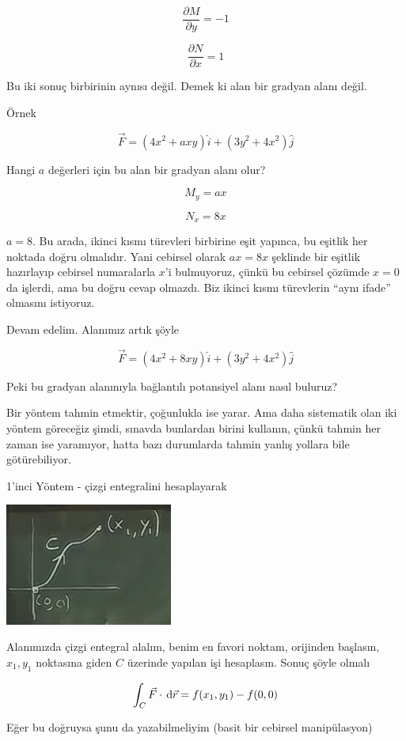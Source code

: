 \documentclass[12pt,fleqn]{article}\usepackage{../../common}
\begin{document}
$$ \frac{\partial M}{\partial y} = -1 $$

$$ \frac{\partial N}{\partial x} = 1 $$

Bu iki sonuç birbirinin aynısı değil. Demek ki alan bir gradyan alanı
değil. 

Örnek

$$ \vec{F} = (4x^2 + axy)\hat{i} + (3y^2 + 4x^2)\hat{j} $$

Hangi $a$ değerleri için bu alan bir gradyan alanı olur? 

$$ M_y = ax $$

$$ N_x = 8x $$

$a=8$. Bu arada, ikinci kısmı türevleri birbirine eşit yapınca, bu eşitlik her
noktada doğru olmalıdır. Yani cebirsel olarak $ax = 8x$ şeklinde bir eşitlik
hazırlayıp cebirsel numaralarla $x$'i bulmuyoruz, çünkü bu cebirsel çözümde
$x=0$ da işlerdi, ama bu doğru cevap olmazdı. Biz ikinci kısmı türevlerin ``aynı
ifade'' olmasını istiyoruz.

Devam edelim. Alanımız artık şöyle

$$ \vec{F} = (4x^2 + 8xy)\hat{i} + (3y^2 + 4x^2)\hat{j} $$

Peki bu gradyan alanınıyla bağlantılı potansiyel alanı nasıl buluruz? 

Bir yöntem tahmin etmektir, çoğunlukla ise yarar. Ama daha sistematik olan iki
yöntem göreceğiz şimdi, sınavda bunlardan birini kullanın, çünkü tahmin her
zaman ise yaramıyor, hatta bazı durumlarda tahmin yanlış yollara bile
götürebiliyor.

1'inci Yöntem - çizgi entegralini hesaplayarak 

\begin{center}
\includegraphics[height=4cm]{21_2.png}
\end{center}

Alanımızda çizgi entegral alalım, benim en favori noktam, orijinden başlasın,
$x_1,y_1$ noktasına giden $C$ üzerinde yapılan işi hesaplasın.  Sonuç şöyle
olmalı

$$ \int_C \vec{F} \cdot \,\mathrm{d}\vec{r} = 
f(x_1,y_1) - f(0,0)
$$

Eğer bu doğruysa şunu da yazabilmeliyim (basit bir cebirsel manipülasyon)
\end{document}
